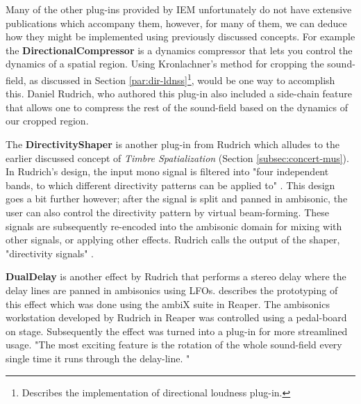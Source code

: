 Many of the other plug-ins provided by IEM unfortunately do not have extensive publications which accompany them, however, for many of them, we can deduce how they might be implemented using previously discussed concepts. For example the \textbf{DirectionalCompressor} is a dynamics compressor that lets you control the dynamics of a spatial region. Using Kronlachner's \cite{kronlachner2014spatial} method for cropping the sound-field, as discussed in Section \ref{par:dir-ldnss}\footnote{Describes the implementation of directional loudness plug-in.}, would be one way to accomplish this. Daniel Rudrich, who authored this plug-in also included a side-chain feature that allows one to compress the rest of the sound-field based on the dynamics of our cropped region.

The \textbf{DirectivityShaper} is another plug-in from Rudrich which alludes to the earlier discussed concept of \textit{Timbre Spatialization} (Section \ref{subsec:concert-mus}). In Rudrich's design, the input mono signal is filtered into "four independent bands, to which different directivity patterns can be applied to" \cite{PluginDe47online}. This design goes a bit further however; after the signal is split and panned in ambisonic, the user can also control the directivity pattern by virtual beam-forming. These signals are subsequently re-encoded into the ambisonic domain for mixing with other signals, or applying other effects. Rudrich calls the output of the shaper, "directivity signals" \cite{Directiv20online}.

\textbf{DualDelay} is another effect by Rudrich that performs a stereo delay where the delay lines are panned in ambisonics using LFOs. \cite{rudrichefficient} describes the prototyping of this effect which was done using the ambiX suite in Reaper. The ambisonics workstation developed by Rudrich in Reaper was controlled using a pedal-board on stage. Subsequently the effect was turned into a plug-in for more streamlined usage. "The most exciting feature is the rotation of the whole sound-field every single time it runs through the delay-line. \cite{PluginDe47online}"

